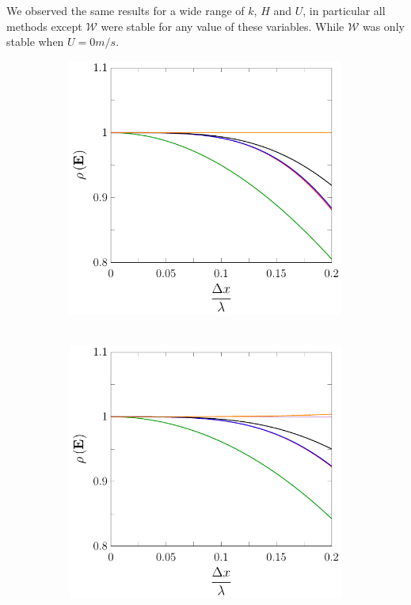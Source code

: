 We observed the same results for a wide range of $k$, $H$ and $U$, in particular all methods except $\mathcal{W}$ were stable for any value of these variables. While $\mathcal{W}$ was only stable when $U = 0m/s$.

\begin{figure}
	\centering
	\begin{subfigure}{0.5\textwidth}
		\includegraphics[width=\textwidth]{./chp4/figures/New/Stabu0.pdf}\
	\end{subfigure}%
	\begin{subfigure}{0.5\textwidth}
		\includegraphics[width=\textwidth]{./chp4/figures/New/Stabu1.pdf}

\end{subfigure}
\end{figure}
